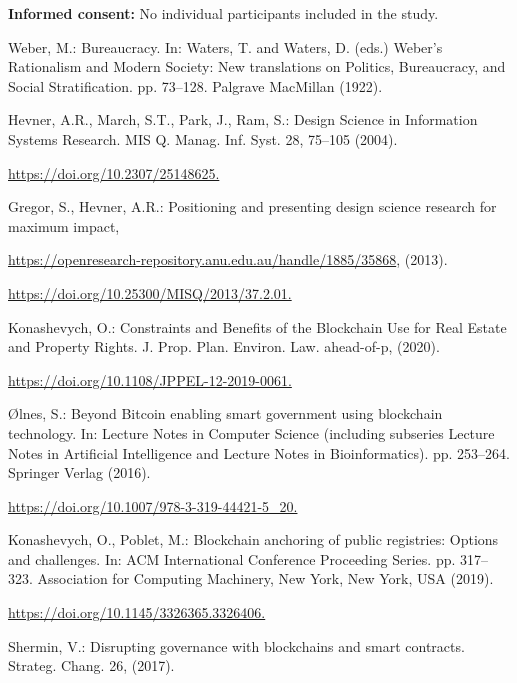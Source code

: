 \begin{multicols}{2}
\textbf{Informed consent:} No individual participants included in the study.

\begin{thebibliography}{99}
 Weber, M.: Bureaucracy. In: Waters, T. and Waters, D. (eds.) Weber’s Rationalism and Modern Society: New translations on Politics, Bureaucracy, and Social Stratification. pp. 73–128. Palgrave MacMillan (1922).

 Hevner, A.R., March, S.T., Park, J., Ram, S.: Design Science in Information Systems Research. MIS Q. Manag. Inf. Syst. 28, 75–105 (2004). 

\url{https://doi.org/10.2307/25148625.}

 Gregor, S., Hevner, A.R.: Positioning and presenting design science research for maximum impact,

\url{https://openresearch-repository.anu.edu.au/handle/1885/35868}, (2013). 

\url{https://doi.org/10.25300/MISQ/2013/37.2.01.}

 Konashevych, O.: Constraints and Benefits of the Blockchain Use for Real Estate and Property Rights. J. Prop. Plan. Environ. Law. ahead-of-p, (2020). 

\url{https://doi.org/10.1108/JPPEL-12-2019-0061.}

 Ølnes, S.: Beyond Bitcoin enabling smart government using blockchain technology. In: Lecture Notes in Computer Science (including subseries Lecture Notes in Artificial Intelligence and Lecture Notes in Bioinformatics). pp. 253–264. Springer Verlag (2016).

\url{https://doi.org/10.1007/978-3-319-44421-5_20.}

 Konashevych, O., Poblet, M.: Blockchain anchoring of public registries: Options and challenges. In: ACM International Conference Proceeding Series. pp. 317–323. Association for Computing Machinery, New York, New York, USA (2019). 

\url{https://doi.org/10.1145/3326365.3326406.}

 Shermin, V.: Disrupting governance with blockchains and smart contracts. Strateg. Chang. 26, (2017). 


\end{thebibliography}
\end{multicols}

